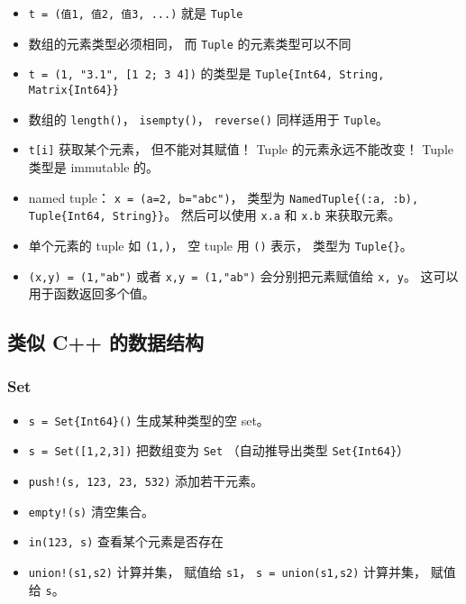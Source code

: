 \begin{itemize}
\item \verb|t = (值1, 值2, 值3, ...)| 就是 \verb|Tuple|
\item 数组的元素类型必须相同， 而 \verb|Tuple| 的元素类型可以不同
\item \verb|t = (1, "3.1", [1 2; 3 4])| 的类型是 \verb|Tuple{Int64, String, Matrix{Int64}}|
\item 数组的 \verb|length()|， \verb|isempty()|， \verb|reverse()| 同样适用于 \verb|Tuple|。
\item \verb|t[i]| 获取某个元素， 但不能对其赋值！ Tuple 的元素永远不能改变！ Tuple 类型是 immutable 的。
\item named tuple： \verb|x = (a=2, b="abc")|， 类型为 \verb|NamedTuple{(:a, :b), Tuple{Int64, String}}|。 然后可以使用 \verb|x.a| 和 \verb|x.b| 来获取元素。
\item 单个元素的 tuple 如 \verb|(1,)|， 空 tuple 用 \verb|()| 表示， 类型为 \verb|Tuple{}|。
\item \verb|(x,y) = (1,"ab")| 或者 \verb|x,y = (1,"ab")| 会分别把元素赋值给 \verb|x, y|。 这可以用于函数返回多个值。
\end{itemize}

\subsection{类似 C++ 的数据结构}
\subsubsection{Set}
\begin{itemize}
\item \verb|s = Set{Int64}()| 生成某种类型的空 set。
\item \verb|s = Set([1,2,3])| 把数组变为 \verb|Set| （自动推导出类型 \verb|Set{Int64}|）
\item \verb|push!(s, 123, 23, 532)| 添加若干元素。
\item \verb|empty!(s)| 清空集合。
\item \verb|in(123, s)| 查看某个元素是否存在
\item \verb|union!(s1,s2)| 计算并集， 赋值给 \verb|s1|， \verb|s = union(s1,s2)| 计算并集， 赋值给 \verb|s|。
\end{itemize}


